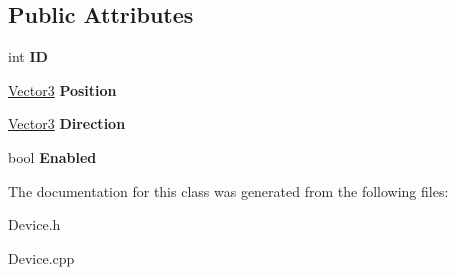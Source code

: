 \subsection*{Public Attributes}
\begin{DoxyCompactItemize}
\item 
int {\bfseries ID}\hypertarget{class_efficio_1_1_device_a300fff98c6e1aed746ef528cf31da24c}{}\label{class_efficio_1_1_device_a300fff98c6e1aed746ef528cf31da24c}

\item 
\hyperlink{class_efficio_1_1_vector3}{Vector3} {\bfseries Position}\hypertarget{class_efficio_1_1_device_a21ba05537c6978805f090e13c62ed220}{}\label{class_efficio_1_1_device_a21ba05537c6978805f090e13c62ed220}

\item 
\hyperlink{class_efficio_1_1_vector3}{Vector3} {\bfseries Direction}\hypertarget{class_efficio_1_1_device_a4da01030cb4382f23700edce87756b16}{}\label{class_efficio_1_1_device_a4da01030cb4382f23700edce87756b16}

\item 
bool {\bfseries Enabled}\hypertarget{class_efficio_1_1_device_ae724390ac1fadd47e528e0231bacf290}{}\label{class_efficio_1_1_device_ae724390ac1fadd47e528e0231bacf290}

\end{DoxyCompactItemize}


The documentation for this class was generated from the following files\+:\begin{DoxyCompactItemize}
\item 
Device.\+h\item 
Device.\+cpp\end{DoxyCompactItemize}
